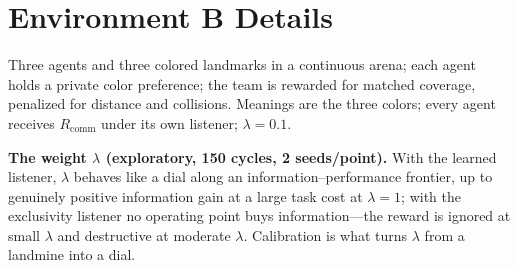 \documentclass[sigconf,review,anonymous]{acmart}
\newcommand{\Rcomm}{R_{\text{comm}}}
\begin{document}
\section{Environment B Details}
\label{app:envb}

Three agents and three colored landmarks in a continuous arena; each agent holds a private color preference; the team is rewarded for matched coverage, penalized for distance and collisions. Meanings are the three colors; every agent receives $\Rcomm$ under its own listener; $\lambda=0.1$.

\textbf{The weight $\lambda$ (exploratory, 150 cycles, 2 seeds/point).} With the learned listener, $\lambda$ behaves like a dial along an information--performance frontier, up to genuinely positive information gain at a large task cost at $\lambda=1$; with the exclusivity listener no operating point buys information---the reward is ignored at small $\lambda$ and destructive at moderate $\lambda$. Calibration is what turns $\lambda$ from a landmine into a dial.
\end{document}
